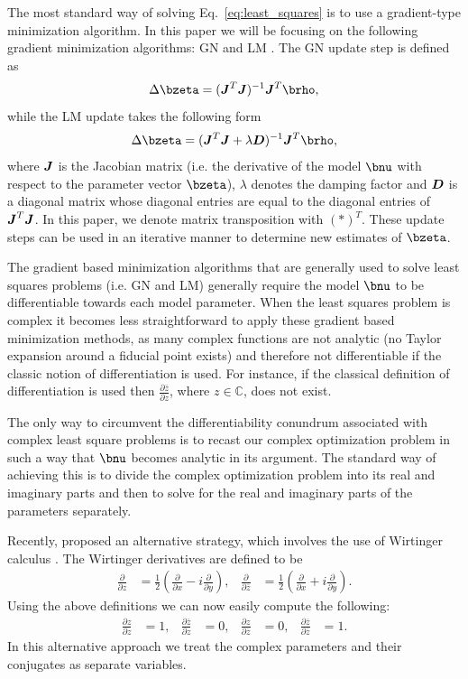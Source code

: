 \documentclass[useAMS,usenatbib]{mn2e}
\newcommand{\bJ}{\bmath{J}}
\newcommand{\bD}{\bmath{D}}
\newcommand{\conj}[1]{\overline{#1}}
\begin{document}
The most standard way of solving Eq.~\eqref{eq:least_squares} is to use a gradient-type minimization algorithm. In this paper we will be focusing on the following gradient minimization algorithms: GN and LM \citep{Levenberg1944,Marquardt1963}. 
The GN update step is defined as
\begin{equation}
 \Delta \bzeta = (\bJ^T\bJ)^{-1} \bJ^T\brho,
\end{equation}
while the LM update takes the following form
\begin{equation}
 \Delta \bzeta = (\bJ^T\bJ+\lambda\bD)^{-1} \bJ^T\brho,
\end{equation}
where $\bJ$ is the Jacobian matrix (i.e. the derivative of the model $\bnu$ with respect to the parameter vector $\bzeta$), $\lambda$ denotes the 
damping factor and $\bD$ is a diagonal matrix whose diagonal entries are equal to the diagonal entries of $\bJ^T\bJ$. In this paper, we denote 
matrix transposition with $(*)^T$.
These update steps can be used in an iterative manner to determine new estimates of $\bzeta$.

The gradient based minimization algorithms that are generally used to solve least squares problems (i.e. GN and LM) generally require the model $\bnu$ to be differentiable
towards each model parameter. When the least squares problem is complex it becomes less straightforward to apply these gradient based minimization methods, as
many complex functions are not analytic (no Taylor expansion around a fiducial point exists) and therefore not differentiable if the classic notion of differentiation is used. For instance, if the 
classical definition of differentiation is used then $\frac{\partial \conj{z}}{\partial z}$, where $z \in \mathbb{C}$, does not exist.

The only way to circumvent the differentiability conundrum associated with complex least square problems is to recast our complex optimization problem in such a way that $\bnu$ becomes analytic in its argument.
The standard way of achieving this is to divide the complex optimization problem into its real and imaginary parts and then to solve for the real and imaginary parts of the parameters separately.

Recently, \citet{Sorber2012} proposed an alternative strategy, which involves the use of Wirtinger calculus \citep{Wirtinger1927}. The Wirtinger derivatives 
are defined to be 
\begin{align}
\label{eq:wir}
\frac{\partial}{\partial z} &= \frac{1}{2}\left ( \frac{\partial}{\partial x} -  i \frac{\partial}{\partial y} \right ),&\frac{\partial}{\partial \conj{z}} &= \frac{1}{2}\left ( \frac{\partial}{\partial x} +  i \frac{\partial}{\partial y} \right ). 
\end{align}
Using the above definitions we can now easily compute the following:
\begin{align}
\frac{\partial z}{\partial z} & = 1, & \frac{\partial \conj{z}}{\partial z}&=0, & \frac{\partial z}{\partial \conj{z}} & = 0, & \frac{\partial \conj{z}}{\partial \conj{z}}&=1.
\end{align}
In this alternative approach we treat the complex parameters and their conjugates as separate variables.
\end{document}
